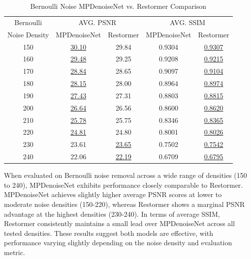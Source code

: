 \begin{table}[H]
    \centering
    \begin{tabular}{ccccc}
        \hline
        Bernoulli & \multicolumn{2}{c}{AVG. PSNR} & \multicolumn{2}{c}{AVG. SSIM} \\
        Noise Density & MPDenoiseNet & Restormer & MPDenoiseNet & Restormer \\
        \hline
        150 & \underline{30.10} & 29.84 & 0.9304 & \underline{0.9307} \\
        160 & \underline{29.48} & 29.25 & 0.9208 & \underline{0.9215} \\
        170 & \underline{28.84} & 28.65 & 0.9097 & \underline{0.9104} \\
        180 & \underline{28.15} & 28.00 & 0.8964 & \underline{0.8974} \\
        190 & \underline{27.43} & 27.31 & 0.8803 & \underline{0.8815} \\
        200 & \underline{26.64} & 26.56 & 0.8600 & \underline{0.8620} \\
        210 & \underline{25.78} & 25.75 & 0.8346 & \underline{0.8365} \\
        220 & \underline{24.81} & 24.80 & 0.8001 & \underline{0.8026} \\
        230 & 23.61 & \underline{23.65} & 0.7502 & \underline{0.7542} \\
        240 & 22.06 & \underline{22.19} & 0.6709 & \underline{0.6795} \\
        \hline
    \end{tabular}
    \caption{Bernoulli Noise MPDenoiseNet vs. Restormer Comparison}
\end{table}

When evaluated on Bernoulli noise removal across a wide range of densities (150 to 240), MPDenoiseNet exhibits performance closely comparable to Restormer. MPDenoiseNet achieves slightly higher average PSNR scores at lower to moderate noise densities (150-220), whereas Restormer shows a marginal PSNR advantage at the highest densities (230-240). In terms of average SSIM, Restormer consistently maintains a small lead over MPDenoiseNet across all tested densities. These results suggest both models are effective, with performance varying slightly depending on the noise density and evaluation metric.